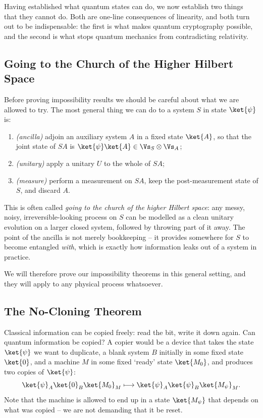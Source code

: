 Having established what quantum states can do, we now establish two things that they cannot do. Both are one-line consequences of linearity, and both turn out to be indispensable: the first is what makes quantum cryptography possible, and the second is what stops quantum mechanics from contradicting relativity.

\subsection{Going to the Church of the Higher Hilbert Space}\label{sec:church}

Before proving impossibility results we should be careful about what we are allowed to try. The most general thing we can do to a system $S$ in state $\ket{\psi}$ is:
\begin{enumerate}[label=(\roman*)]
	\item \emph{(ancilla)} adjoin an auxiliary system $A$ in a fixed state $\ket{A}$, so that the joint state of $SA$ is $\ket{\psi}\ket{A} \in \Vs_S \otimes \Vs_A$;
	\item \emph{(unitary)} apply a unitary $U$ to the whole of $SA$;
	\item \emph{(measure)} perform a measurement on $SA$, keep the post-measurement state of $S$, and discard $A$.
\end{enumerate}
This is often called \emph{going to the church of the higher Hilbert space}: any messy, noisy, irreversible-looking process on $S$ can be modelled as a clean unitary evolution on a larger closed system, followed by throwing part of it away. The point of the ancilla is not merely bookkeeping -- it provides somewhere for $S$ to become entangled \emph{with}, which is exactly how information leaks out of a system in practice.

We will therefore prove our impossibility theorems in this general setting, and they will apply to any physical process whatsoever.

\subsection{The No-Cloning Theorem}\label{sec:nocloning}

Classical information can be copied freely: read the bit, write it down again. Can quantum information be copied? A copier would be a device that takes the state $\ket{\psi}$ we want to duplicate, a blank system $B$ initially in some fixed state $\ket{0}$, and a machine $M$ in some fixed `ready' state $\ket{M_0}$, and produces two copies of $\ket{\psi}$:
$$\ket{\psi}_A\ket{0}_B\ket{M_0}_M \longmapsto \ket{\psi}_A\ket{\psi}_B\ket{M_\psi}_M.$$
Note that the machine is allowed to end up in a state $\ket{M_\psi}$ that depends on what was copied -- we are not demanding that it be reset.

